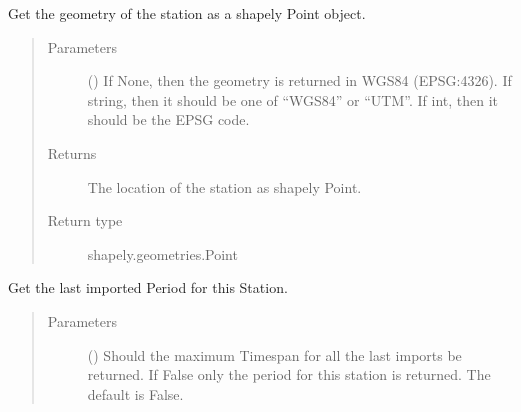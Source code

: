 \documentclass[letterpaper,10pt,english]{sphinxmanual}
\begin{document}
\begin{fulllineitems}

\begin{fulllineitems}
\label{\detokenize{weatherDB:weatherDB.station.StationBase.get_geom_shp}}
\sphinxAtStartPar
Get the geometry of the station as a shapely Point object.
\begin{quote}\begin{description}
\item[{Parameters}] \leavevmode
\sphinxAtStartPar
{} (\sphinxstyleliteralemphasis{\sphinxupquote{, }}\sphinxstyleliteralemphasis{\sphinxupquote{, }}) \textendash{} If None, then the geometry is returned in WGS84 (EPSG:4326).
If string, then it should be one of “WGS84” or “UTM”.
If int, then it should be the EPSG code.

\item[{Returns}] \leavevmode
\sphinxAtStartPar
The location of the station as shapely Point.

\item[{Return type}] \leavevmode
\sphinxAtStartPar
shapely.geometries.Point

\end{description}\end{quote}

\end{fulllineitems}


\begin{fulllineitems}
\label{\detokenize{weatherDB:weatherDB.station.StationBase.get_last_imp_period}}
\sphinxAtStartPar
Get the last imported Period for this Station.
\begin{quote}\begin{description}
\item[{Parameters}] \leavevmode
\sphinxAtStartPar
{} (\sphinxstyleliteralemphasis{\sphinxupquote{, }}) \textendash{} Should the maximum Timespan for all the last imports be returned.
If False only the period for this station is returned.
The default is False.


\end{description}
\end{quote}
\end{fulllineitems}
\end{fulllineitems}
\end{document}
